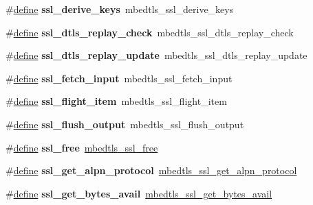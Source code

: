 \begin{DoxyCompactItemize}
\#\hyperlink{structdefine}{define} {\bfseries ssl\+\_\+derive\+\_\+keys}~mbedtls\+\_\+ssl\+\_\+derive\+\_\+keys
\item 
\mbox{\label{compat-1_83_8h_a53173df95992a59e166d798dc3d6a474}} 
\#\hyperlink{structdefine}{define} {\bfseries ssl\+\_\+dtls\+\_\+replay\+\_\+check}~mbedtls\+\_\+ssl\+\_\+dtls\+\_\+replay\+\_\+check
\item 
\mbox{\label{compat-1_83_8h_a12956774330a1d23bf6f9d2ce7a9e0cc}} 
\#\hyperlink{structdefine}{define} {\bfseries ssl\+\_\+dtls\+\_\+replay\+\_\+update}~mbedtls\+\_\+ssl\+\_\+dtls\+\_\+replay\+\_\+update
\item 
\mbox{\label{compat-1_83_8h_a971f1446b8c55c770eeb8cedb467cf11}} 
\#\hyperlink{structdefine}{define} {\bfseries ssl\+\_\+fetch\+\_\+input}~mbedtls\+\_\+ssl\+\_\+fetch\+\_\+input
\item 
\mbox{\label{compat-1_83_8h_adac5866358fe954b866c0e5108636ba3}} 
\#\hyperlink{structdefine}{define} {\bfseries ssl\+\_\+flight\+\_\+item}~mbedtls\+\_\+ssl\+\_\+flight\+\_\+item
\item 
\mbox{\label{compat-1_83_8h_afdd6a3a31ebccc7d0fb6c4088312b150}} 
\#\hyperlink{structdefine}{define} {\bfseries ssl\+\_\+flush\+\_\+output}~mbedtls\+\_\+ssl\+\_\+flush\+\_\+output
\item 
\mbox{\label{compat-1_83_8h_a92c8065e8d5424e953c6604a83f76385}} 
\#\hyperlink{structdefine}{define} {\bfseries ssl\+\_\+free}~\hyperlink{ssl_8h_a2dc104a181bcd11eafbbf7e6923978bc}{mbedtls\+\_\+ssl\+\_\+free}
\item 
\mbox{\label{compat-1_83_8h_a04dcb33243e3857e8459044556da2dfa}} 
\#\hyperlink{structdefine}{define} {\bfseries ssl\+\_\+get\+\_\+alpn\+\_\+protocol}~\hyperlink{ssl_8h_ad1ab606db1a9307b4aacccdcd1d1a6ef}{mbedtls\+\_\+ssl\+\_\+get\+\_\+alpn\+\_\+protocol}
\item 
\mbox{\label{compat-1_83_8h_ad43aaf6581b9762546cdf75c8b2370b1}} 
\#\hyperlink{structdefine}{define} {\bfseries ssl\+\_\+get\+\_\+bytes\+\_\+avail}~\hyperlink{ssl_8h_ad43142085f3182e9b0dc967ec582032b}{mbedtls\+\_\+ssl\+\_\+get\+\_\+bytes\+\_\+avail}

\end{DoxyCompactItemize}
